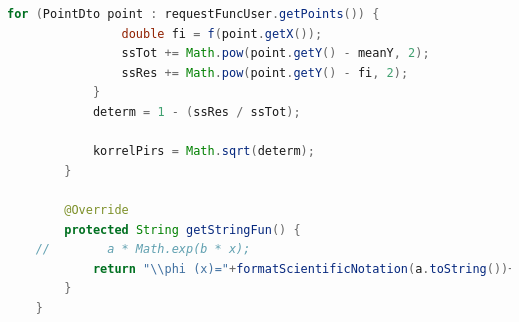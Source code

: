 \documentclass{article}
\begin{document}
\begin{lstlisting}[language=Java, caption={Експоненциальная аппроксимация}]
            for (PointDto point : requestFuncUser.getPoints()) {
                double fi = f(point.getX());
                ssTot += Math.pow(point.getY() - meanY, 2);
                ssRes += Math.pow(point.getY() - fi, 2);
            }
            determ = 1 - (ssRes / ssTot);
    
            korrelPirs = Math.sqrt(determ);
        }
    
        @Override
        protected String getStringFun() {
    //        a * Math.exp(b * x);
            return "\\phi (x)="+formatScientificNotation(a.toString())+"\\cdot e^{"+formatScientificNotation(b.toString())+"\\cdot x}";
        }
    }
    
\end{lstlisting}
\end{document}
